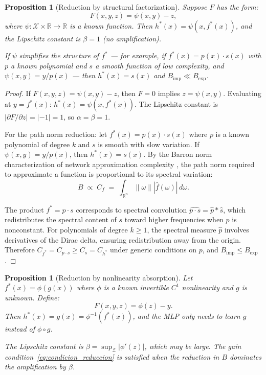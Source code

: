 \documentclass[12pt]{article}
\newtheorem{proposition}[theorem]{Proposition}
\newcommand{\R}{\mathbb{R}}
\newcommand{\norm}[1]{\left\|#1\right\|}
\begin{document}
\begin{proposition}[Reduction by structural factorization]
\label{prop:factorizacion}
Suppose $F$ has the form:
\begin{equation}
  F(x, y, z) = \psi(x, y) - z,
  \label{eq:F_factorizada}
\end{equation}
where $\psi: \mathcal{X} \times \R \to \R$ is a known function.
Then $h^*(x) = \psi(x, f^*(x))$, and the Lipschitz constant is
$\beta = 1$ (no amplification).

If $\psi$ simplifies the structure of $f^*$ --- for example, if
$f^*(x) = p(x) \cdot s(x)$ with $p$ a known polynomial and $s$ a
smooth function of low complexity, and
$\psi(x, y) = y / p(x)$ --- then $h^*(x) = s(x)$ and
$B_{\mathrm{imp}} \ll B_{\mathrm{exp}}$.
\end{proposition}

\begin{proof}
If $F(x,y,z) = \psi(x,y) - z$, then $F = 0$ implies
$z = \psi(x,y)$.
Evaluating at $y = f^*(x)$: $h^*(x) = \psi(x, f^*(x))$.
The Lipschitz constant is
$|\partial F / \partial z| = |-1| = 1$, so $\alpha = \beta = 1$.

For the path norm reduction: let $f^*(x) = p(x) \cdot s(x)$ where
$p$ is a known polynomial of degree $k$ and $s$ is smooth with slow
variation.
If $\psi(x,y) = y/p(x)$, then $h^*(x) = s(x)$.
By the Barron norm characterization of network approximation
complexity \cite{Barron1993}, the path norm required to approximate
a function is proportional to its spectral variation:
\begin{equation}
  B \;\propto\; C_f
  \;=\; \int_{\R^n} \norm{\omega} |\hat{f}(\omega)| \, d\omega.
\end{equation}

The product $f^* = p \cdot s$ corresponds to spectral convolution
$\widehat{p \cdot s} = \hat{p} * \hat{s}$, which redistributes the
spectral content of $s$ toward higher frequencies when $p$ is
nonconstant.
For polynomials of degree $k \ge 1$, the spectral measure $\hat{p}$
involves derivatives of the Dirac delta, ensuring redistribution
away from the origin.
Therefore $C_{f^*} = C_{p \cdot s} \ge C_s = C_{h^*}$ under generic
conditions on $p$, and $B_{\mathrm{imp}} \le B_{\mathrm{exp}}$.
\end{proof}

\begin{proposition}[Reduction by nonlinearity absorption]
\label{prop:absorcion}
Let $f^*(x) = \phi(g(x))$ where $\phi$ is a known invertible $C^1$
nonlinearity and $g$ is unknown.
Define:
\begin{equation}
  F(x, y, z) = \phi(z) - y.
\end{equation}
Then $h^*(x) = g(x) = \phi^{-1}(f^*(x))$, and the MLP only needs to
learn $g$ instead of $\phi \circ g$.

The Lipschitz constant is $\beta = \sup_{\mathcal{Z}} |\phi'(z)|$,
which may be large.
The gain condition~\eqref{eq:condicion_reduccion} is satisfied when
the reduction in $B$ dominates the amplification by $\beta$.
\end{proposition}
\end{document}

